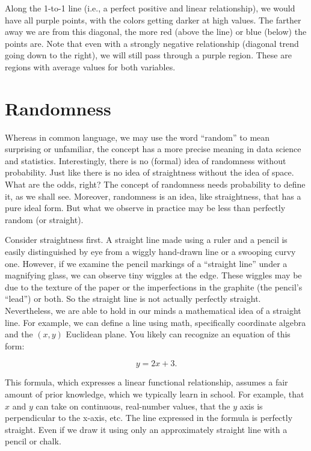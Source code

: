 \documentclass[openany]{book}
\begin{document}
Along the 1-to-1 line (i.e., a perfect positive and linear relationship), we would have all purple points, with the colors getting darker at high values. The farther away we are from this diagonal, the more red (above the line) or blue (below) the points are. Note that even with a strongly negative relationship (diagonal trend going down to the right), we will still pass through a purple region. These are regions with average values for both variables.

\hypertarget{appendix-appendix}{%
\appendix}


\hypertarget{sec:randomness}{%
\chapter{Randomness}\label{sec:randomness}}

Whereas in common language, we may use the word ``random'' to mean surprising or unfamiliar, the concept has a more precise meaning in data science and statistics. Interestingly, there is no (formal) idea of randomness without probability. Just like there is no idea of straightness without the idea of space. What are the odds, right? The concept of randomness needs probability to define it, as we shall see. Moreover, randomness is an idea, like straightness, that has a pure ideal form. But what we observe in practice may be less than perfectly random (or straight).

Consider straightness first. A straight line made using a ruler and a pencil is easily distinguished by eye from a wiggly hand-drawn line or a swooping curvy one. However, if we examine the pencil markings of a ``straight line'' under a magnifying glass, we can observe tiny wiggles at the edge. These wiggles may be due to the texture of the paper or the imperfections in the graphite (the pencil's ``lead'') or both. So the straight line is not actually perfectly straight. Nevertheless, we are able to hold in our minds a mathematical idea of a straight line. For example, we can define a line using math, specifically coordinate algebra and the \((x,y)\) Euclidean plane. You likely can recognize an equation of this form:

\[ y = 2 x + 3.\]

This formula, which expresses a linear functional relationship, assumes a fair amount of prior knowledge, which we typically learn in school. For example, that \(x\) and \(y\) can take on continuous, real-number values, that the \(y\) axis is perpendicular to the x-axis, etc. The line expressed in the formula is perfectly straight. Even if we draw it using only an approximately straight line with a pencil or chalk.
\end{document}
